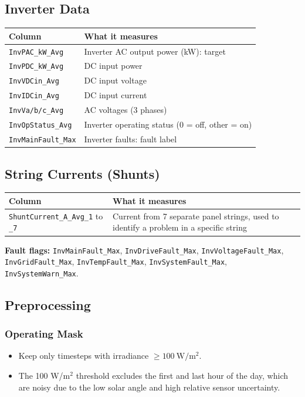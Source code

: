 \documentclass[11pt,a4paper]{article}
\begin{document}
\subsection*{Inverter Data}
\begin{tabularx}{\textwidth}{@{}p{}Y@{}}
\hline
\textbf{Column} & \textbf{What it measures} \\
\hline
\texttt{InvPAC\_kW\_Avg} & Inverter AC output power (kW): target \\
\texttt{InvPDC\_kW\_Avg} & DC input power \\
\texttt{InvVDCin\_Avg} & DC input voltage \\
\texttt{InvIDCin\_Avg} & DC input current \\
\texttt{InvVa/b/c\_Avg} & AC voltages (3 phases) \\
\texttt{InvOpStatus\_Avg} & Inverter operating status (0 = off, other = on) \\
\texttt{InvMainFault\_Max} & Inverter faults: fault label \\
\hline
\end{tabularx}

\subsection*{String Currents (Shunts)}
\begin{tabularx}{\textwidth}{@{}p{}Y@{}}
\hline
\textbf{Column} & \textbf{What it measures} \\
\hline
\texttt{ShuntCurrent\_A\_Avg\_1} to \texttt{\_7} & Current from 7 separate panel strings, used to identify a problem in a specific string \\
\hline
\end{tabularx}

\smallskip
{\raggedright\noindent\textbf{Fault flags:} \texttt{InvMainFault\_Max}, \texttt{InvDriveFault\_Max}, \texttt{InvVoltageFault\_Max}, \texttt{InvGridFault\_Max}, \texttt{InvTempFault\_Max}, \texttt{InvSystemFault\_Max}, \texttt{InvSystemWarn\_Max}.\par}

\subsection*{Preprocessing}

\subsubsection*{Operating Mask}
\begin{itemize}
    \item Keep only timesteps with irradiance $\geq 100\ \mathrm{W/m^2}$.
    \item The 100 W/m$^2$ threshold excludes the first and last hour of the day, which are noisy due to the low solar angle and high relative sensor uncertainty.
\end{itemize}
\end{document}
